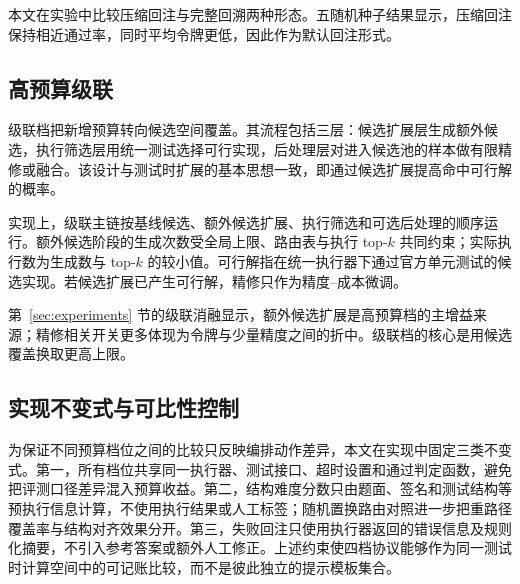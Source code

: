 

本文在实验中比较压缩回注与完整回溯两种形态。五随机种子结果显示，压缩回注保持相近通过率，同时平均令牌更低，因此作为默认回注形式。

\subsection{高预算级联}
\label{sec:cascade}

级联档把新增预算转向候选空间覆盖。其流程包括三层：候选扩展层生成额外候选，执行筛选层用统一测试选择可行实现，后处理层对进入候选池的样本做有限精修或融合。该设计与测试时扩展的基本思想一致，即通过候选扩展提高命中可行解的概率\cite{li2022alphacode,li2025sstar}。

实现上，级联主链按基线候选、额外候选扩展、执行筛选和可选后处理的顺序运行。额外候选阶段的生成次数受全局上限、路由表与执行 top-$k$ 共同约束；实际执行数为生成数与 top-$k$ 的较小值。可行解指在统一执行器下通过官方单元测试的候选实现。若候选扩展已产生可行解，精修只作为精度--成本微调。

第~\ref{sec:experiments} 节的级联消融显示，额外候选扩展是高预算档的主增益来源；精修相关开关更多体现为令牌与少量精度之间的折中。级联档的核心是用候选覆盖换取更高上限。

\subsection{实现不变式与可比性控制}
\label{sec:method-invariants}

为保证不同预算档位之间的比较只反映编排动作差异，本文在实现中固定三类不变式。第一，所有档位共享同一执行器、测试接口、超时设置和通过判定函数，避免把评测口径差异混入预算收益。第二，结构难度分数只由题面、签名和测试结构等预执行信息计算，不使用执行结果或人工标签；随机置换路由对照进一步把重路径覆盖率与结构对齐效果分开。第三，失败回注只使用执行器返回的错误信息及规则化摘要，不引入参考答案或额外人工修正。上述约束使四档协议能够作为同一测试时计算空间中的可记账比较，而不是彼此独立的提示模板集合。
